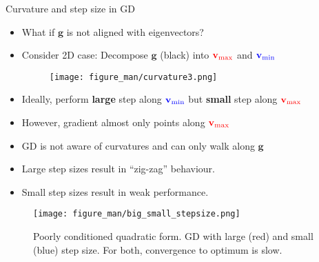 \documentclass[11pt,compress,t,notes=noshow, xcolor=table]{beamer}
\begin{document}
\begin{vbframe}{Curvature and step size in GD}
\begin{itemize}
    \item What if $\mathbf{g}$ is not aligned with eigenvectors?
    \item Consider 2D case: Decompose $\mathbf{g}$ (black) into $\textcolor{red}{\mathbf{v}_{\text{max}}}$ and $\textcolor{blue}{\mathbf{v}_{\text{min}}}$
        \begin{figure}
            \centering
            \texttt{[image: figure\_man/curvature3.png]}
        \end{figure}
    \item Ideally, perform \textbf{large} step along $\textcolor{blue}{\mathbf{v}_{\text{min}}}$ but \textbf{small} step along $\textcolor{red}{\mathbf{v}_{\text{max}}}$
    \item However, gradient almost only points along $\textcolor{red}{\mathbf{v}_\text{max}}$
\end{itemize}

\framebreak 

\begin{itemize}

    \item GD is not aware of curvatures and can only walk along $\mathbf{g}$
    \item Large step sizes result in \enquote{zig-zag} behaviour.
    \item Small step sizes result in weak performance.
\end{itemize}

\begin{figure}
    \centering
    \texttt{[image: figure\_man/big\_small\_stepsize.png]}
    \caption*{\centering Poorly conditioned quadratic form.
        GD with large (red) and small (blue) step size.
        For both, convergence to optimum is slow.}
\end{figure}


\end{vbframe}
\end{document}
